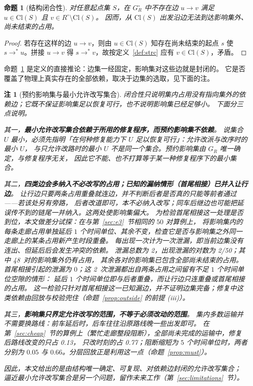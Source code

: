 \documentclass[manuscript,screen,review]{acmart}
\newcommand{\NPairs}{50}
\newcommand{\ProbeLeakPairs}{2/50}
\newcommand{\ProbeLeaks}{2}
\newcommand{\ProbeOutsidePairs}{48}  %
\newcommand{\WCRouteFrac}{0.13}          %
\newcommand{\WCTimeFrac}{0.77}           %
\newtheorem{remark}{注}
\newtheorem{prop}{命题}
\begin{document}
\begin{prop}[结构闭合性]
\label{prop:struct}
对任意起点集 \(S\)，在 \(G_R^\circ\) 中不存在边
\(u\to v\) 满足 \(u\in\mathrm{Cl}(S)\) 且 \(v\in R^{\circ}\setminus\mathrm{Cl}(S)\)。
因而，从 \(\mathrm{Cl}(S)\) 出发沿边无法到达影响集外、尚未结束的占用。
\end{prop}

\begin{proof}
若存在这样的边 \(u\to v\)，则由 \(u\in\mathrm{Cl}(S)\) 知存在尚未结束的起点 \(s\) 使
\(s\to^* u\)。拼接 \(u\to v\) 得 \(s\to^* v\)，故按定义~\ref{def:strc} 应有
\(v\in\mathrm{Cl}(S)\)，矛盾。
\end{proof}

命题~\ref{prop:struct} 是定义的直接推论：边集一经固定，影响集对这些边就是封闭的。
它是否覆盖了物理上真实存在的全部依赖，取决于边集的选取，见下面的注。

\begin{remark}[预约影响集与最小允许改写集合]
\label{rem:minimality}
闭合性只说明集内占用没有指向集外的依赖边；它既不保证影响集足以恢复可行，也不说明影响集已经足够小。
下面分三点说明。

其一，\textbf{最小允许改写集合依赖于所用的修复程序，而预约影响集不依赖}。
说集合 \(U\) 最小，必须先指明「在何种修复能力下 \(U\) 足以恢复可行」：允许改派与改序时的最小 \(U\)，
与只允许改路时的最小 \(U\) 不是同一个集合。预约影响集由 \(G_R\) 唯一确定，与修复程序无关，
因此它不能、也不打算等于某一种修复程序下的最小集合。

其二，\textbf{四类边会多纳入不必改写的占用；已知的漏纳情形（首尾相接）已并入让行边}。
让行边只要两条占用重叠就连边，并不判断后者是否\emph{真的}只能等前者通过——若该处另有旁路，
后者改道即可，本不必纳入改写；同车后继边也可能把延误传不到的链尾一并纳入。这两处使影响集偏大。
为检验首尾相接这一处理是否到位，本文做\emph{差分试探}：在与第~\ref{sec:e3}~节相同的 \(\NPairs\) 对算例上，
将影响集内的每条走廊占用单独延后 \(1\) 个时间单位、其余不变，检查它是否与影响集之外同一走廊上的某条占用新产生时段重叠。
每出现一次计为一次泄漏，即当前边集没有连出、但延后后会发生冲突的依赖。
泄漏总数为 \ProbeLeaks，出现泄漏的对数为 \ProbeLeakPairs；其中 \ProbeOutsidePairs\ 对的影响集外仍有占用，
其余各对的影响集已包含全部尚未结束的占用。首尾相接引起的泄漏为 \(0\)；这 \ProbeLeaks\ 次泄漏都出自两条占用之间留有不足 \(1\) 个时间单位空隙的情形：
延后 \(1\) 个时间单位即与后者重叠，而让行边只连重叠或首尾相接的占用。
这一检验只针对首尾相接这一已知漏边，并不证明边集完备；修复中这类依赖由回放与校验兜住（命题~\ref{prop:outside} 的前提 (iii)）。

其三，\textbf{影响集只界定\emph{允许}改写的范围，不等于\emph{必须}改动的范围}。
集内多数运输并不需要换路线：前车延后时，后车往往沿原路线晚一些出发即可。
在第~\ref{sec:cheap}~节的算例上（繁忙走廊整段阻断），全部尚未完成的运输中，修复后路线改变的只占 \WCRouteFrac，
只改时刻的占 \WCTimeFrac；阻断缩短为 \(5\) 个时间单位时，两者分别为 \(0.05\) 与 \(0.66\)。分层回放正是利用这一点（命题~\ref{prop:must}）。

因此，本文给出的是由结构唯一确定、可复现、对依赖边封闭的允许改写集合；
逼近最小允许改写集合是另一个问题，留作未来工作（第~\ref{sec:limitations}~节）。
\end{remark}
\end{document}
